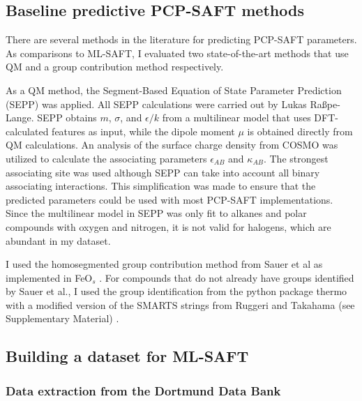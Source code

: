 \subsection{Baseline predictive PCP-SAFT methods}\label{sec:baselines}

There are several methods in the literature for predicting PCP-SAFT parameters. As comparisons to ML-SAFT, I evaluated two state-of-the-art methods that use QM and a group contribution method respectively.

As a QM method, the Segment-Based Equation of State Parameter Prediction (SEPP) \cite{Kaminski2020} was applied. All SEPP calculations were carried out by Lukas Ra{\ss}pe-Lange. SEPP obtains $m$, $\sigma$, and $\epsilon/k$ from a multilinear model that uses DFT-calculated features as input, while the dipole moment $\mu$ is obtained directly from QM calculations. An analysis of the surface charge density from COSMO \cite{Klamt1995} was utilized to calculate the associating parameters $\epsilon_{AB}$ and $\kappa_{AB}$. The strongest associating site was used although SEPP can take into account all binary associating interactions. This simplification was made to ensure that the predicted parameters could be used with most PCP-SAFT implementations. Since the multilinear model in SEPP was only fit to alkanes and polar compounds with oxygen and nitrogen, it is not valid for halogens, which are abundant in my dataset.

I used the homosegmented group contribution method from Sauer et al \cite{Sauer2014} as implemented in FeO$_{s}$ \cite{Rehner2023}. For compounds that do not already have groups identified by Sauer et al., I used the group identification from the python package thermo \cite{thermopython} with a modified version of the SMARTS strings from Ruggeri and Takahama (see Supplementary Material) \cite{Ruggeri2016}.

\subsection{Building a dataset for ML-SAFT}\label{subsec:data_set}


\subsubsection{Data extraction from the Dortmund Data Bank}

